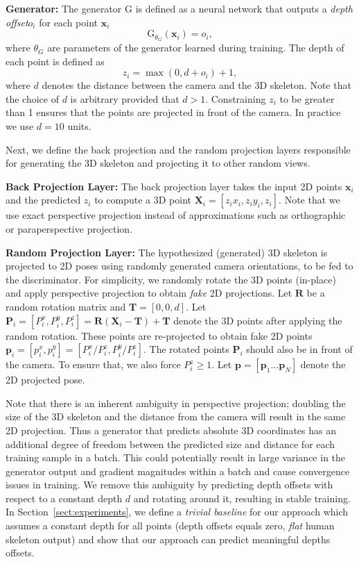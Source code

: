 \documentclass[runningheads]{llncs}
\begin{document}
\textbf{Generator:} The generator $\textrm{G}$ is defined as a neural network that outputs a \textit{depth offset}$o_i$ for each point $\textbf{x}_i$\begin{equation}
\textrm{G}_{\theta_G}(\textbf{x}_i) = o_i,
\end{equation}
where $\theta_G$ are parameters of the generator learned during training. The depth of each point is defined as
\begin{equation}
z_i = \max\left(0, d + o_i \right) + 1,
\end{equation}
where $d$ denotes the distance between the camera and the 3D skeleton. Note that the choice of $d$ is arbitrary provided that $d>1$. Constraining $z_i$ to be greater than 1 ensures that the points are projected in front of the camera. In practice we use $d=10$ units.

Next, we define the back projection and the random projection layers responsible for generating the 3D skeleton and projecting it to other random views.

\textbf{Back Projection Layer:} The back projection layer takes the input 2D points $\textbf{x}_i$ and the predicted $z_i$ to compute a 3D point $\textbf{X}_i = [z_i{x}_i,z_i{y}_i,z_i]$. Note that we use exact perspective projection instead of approximations such as orthographic or paraperspective projection. 

\textbf{Random Projection Layer:} The hypothesized (generated) 3D skeleton is projected to 2D poses using randomly generated camera orientations, to be fed to the discriminator. For simplicity, we randomly rotate the 3D points (in-place) and apply perspective projection to obtain \textit{fake} 2D projections. Let $\textbf{R}$ be a random rotation matrix and $\textbf{T}=[0,0,d]$. Let $\textbf{P}_i = \left[ P^x_i, P^y_i, P^z_i \right]   = \textbf{R}(\textbf{X}_i - \textbf{T}) + \textbf{T}$ denote the 3D points after applying the random rotation. These points are re-projected to obtain fake 2D points $\textbf{p}_i = \left[ p^x_i, p^y_i \right] = \left[{P}_i^x / {P}_i^z,  {P}_i^y / {P}_i^z \right]$. The rotated points $\textbf{P}_i$ should also be in front of the camera. To ensure that, we also force ${P}_i^z$$\geq1$. Let $\textbf{p} = \left[ \textbf{p}_1 \ldots \textbf{p}_N \right]$ denote the 2D projected pose.


Note that there is an inherent ambiguity in perspective projection; doubling the size of the 3D skeleton and the distance from the camera will result in the same 2D projection. Thus a generator that predicts absolute 3D coordinates has an additional degree of freedom between the predicted size and distance for each training sample in a batch. This could potentially result in large variance in the generator output and gradient magnitudes within a batch and cause convergence issues in training. We remove this ambiguity by predicting depth offsets with respect to a constant depth $d$ and rotating around it, resulting in stable training. In Section~\ref{sect:experiments}, we define a \textit{trivial baseline} for our approach which assumes a constant depth for all points (depth offsets equals zero, \textit{flat} human skeleton output) and show that our approach can predict meaningful depths offsets.
\end{document}
